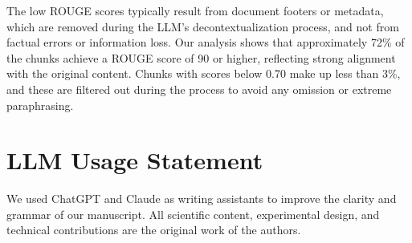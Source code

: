 \documentclass{article} %
\begin{document}
The low ROUGE scores typically result from document footers or metadata, which are removed during the LLM's decontextualization process, and not from factual errors or information loss. Our analysis shows that approximately 72\% of the chunks achieve a ROUGE score of 90 or higher, reflecting strong alignment with the original content. Chunks with scores below 0.70 make up less than 3\%, and these are filtered out during the process to avoid any omission or extreme paraphrasing.

\section{LLM Usage Statement}
We used ChatGPT and Claude as writing assistants to improve the clarity and grammar of our manuscript. All scientific content, experimental design, and technical contributions are the original work of the authors.
\end{document}

